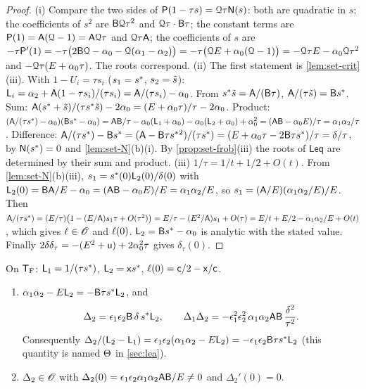 \begin{proof}
(i) Compare the two sides of $\mathsf{P}(1-\tau s)=\mathcal{Q}\tau\mathsf{N}(s)$: both are quadratic in $s$; the coefficients of $s^2$ are $\mathsf{B}\mathcal{Q}\tau^2$ and $\mathcal{Q}\tau\cdot\mathsf{B}\tau$; the constant terms are $\mathsf{P}(1)=\mathsf{A}(\mathcal{Q}-1)=\mathsf{A}\mathcal{Q}\tau$ and $\mathcal{Q}\tau\mathsf{A}$; the coefficients of $s$ are $-\tau\mathsf{P}'(1)=-\tau\big(2\mathsf{B}\mathcal{Q}-\alpha_0-\mathcal{Q}(\alpha_1-\alpha_2)\big)=-\tau\big(\mathcal{Q} E+\alpha_0(\mathcal{Q}-1)\big)=-\mathcal{Q}\tau E-\alpha_0\mathcal{Q}\tau^2$ and $-\mathcal{Q}\tau(E+\alpha_0\tau)$. The roots correspond. (ii) The first statement is \cref{lem:set-crit}(iii). With $1-U_i=\tau s_i$ ($s_1=s^{\ast}$, $s_2=\tilde{s}$): $\mathsf{L}_i=\alpha_2+\mathsf{A}(1-\tau s_i)/(\tau s_i)=\mathsf{A}/(\tau s_i)-\alpha_0$. From $s^{\ast}\tilde{s}=\mathsf{A}/(\mathsf{B}\tau)$, $\mathsf{A}/(\tau\tilde{s})=\mathsf{B}s^{\ast}$. Sum: $\mathsf{A}(s^{\ast}+\tilde{s})/(\tau s^{\ast}\tilde{s})-2\alpha_0=(E+\alpha_0\tau)/\tau-2\alpha_0$. Product: $(\mathsf{A}/(\tau s^{\ast})-\alpha_0)(\mathsf{B}s^{\ast}-\alpha_0)=\mathsf{A}\mathsf{B}/\tau-\alpha_0(\mathsf{L}_1+\alpha_0)-\alpha_0(\mathsf{L}_2+\alpha_0)+\alpha_0^2=(\mathsf{A}\mathsf{B}-\alpha_0E)/\tau=\alpha_1\alpha_2/\tau$. Difference: $\mathsf{A}/(\tau s^{\ast})-\mathsf{B}s^{\ast}=(\mathsf{A}-\mathsf{B}\tau s^{\ast}{}^2)/(\tau s^{\ast})=(E+\alpha_0\tau-2\mathsf{B}\tau s^{\ast})/\tau=\delta/\tau$, by $\mathsf{N}(s^{\ast})=0$ and \cref{lem:set-N}(b)(i). By \cref{prop:set-frob}(iii) the roots of $\mathsf{Leq}$ are determined by their sum and product. (iii) $1/\tau=1/t+1/2+O(t)$. From \cref{lem:set-N}(b)(iii), $s_1=s^{\ast}(0)\mathsf{L}_2(0)/\delta(0)$ with $\mathsf{L}_2(0)=\mathsf{B}\mathsf{A}/E-\alpha_0=(\mathsf{A}\mathsf{B}-\alpha_0E)/E=\alpha_1\alpha_2/E$, so $s_1=(\mathsf{A}/E)(\alpha_1\alpha_2/E)/E$. Then $\mathsf{A}/(\tau s^{\ast})=(E/\tau)\big(1-(E/\mathsf{A})s_1\tau+O(\tau^2)\big)=E/\tau-(E^2/\mathsf{A})s_1+O(\tau)=E/t+E/2-\alpha_1\alpha_2/E+O(t)$, which gives $\ell\in\mathscr{O}$ and $\ell(0)$. $\mathsf{L}_2=\mathsf{B}s^{\ast}-\alpha_0$ is analytic with the stated value. Finally $2\delta\delta_\tau=-(E^2+\mathsf{u})+2\alpha_0^2\tau$ gives $\delta_\tau(0)$.
\end{proof}

On $\mathsf{T}_{\mathrm{F}}$: $\mathsf{L}_1=1/(\tau s^{\ast})$, $\mathsf{L}_2=\mathsf{x}s^{\ast}$, $\ell(0)=\mathsf{c}/2-\mathsf{x}/\mathsf{c}$.

\begin{lem}
\label{lem:set-Delta2}
\begin{enumerate}
\item $\alpha_1\alpha_2-E\mathsf{L}_2=-\mathsf{B}\tau s^{\ast}\mathsf{L}_2$, and
\[
\Delta_2=\epsilon_1\epsilon_2\mathsf{B}\,\delta\,s^{\ast}\mathsf{L}_2,\qquad
\Delta_1\Delta_2=-\epsilon_1^2\epsilon_2^2\,\alpha_1\alpha_2\mathsf{A}\mathsf{B}\,\frac{\delta^2}{\tau^2}.
\]
Consequently $\Delta_2/(\mathsf{L}_2-\mathsf{L}_1)=\epsilon_1\epsilon_2(\alpha_1\alpha_2-E\mathsf{L}_2)=-\epsilon_1\epsilon_2\mathsf{B}\tau s^{\ast}\mathsf{L}_2$ (this quantity is named $\Theta$ in \cref{sec:lea}).
\item $\Delta_2\in\mathscr{O}$ with $\Delta_2(0)=\epsilon_1\epsilon_2\alpha_1\alpha_2\mathsf{A}\mathsf{B}/E\neq0$ and $\Delta_2'(0)=0$.
\end{enumerate}
\end{lem}

